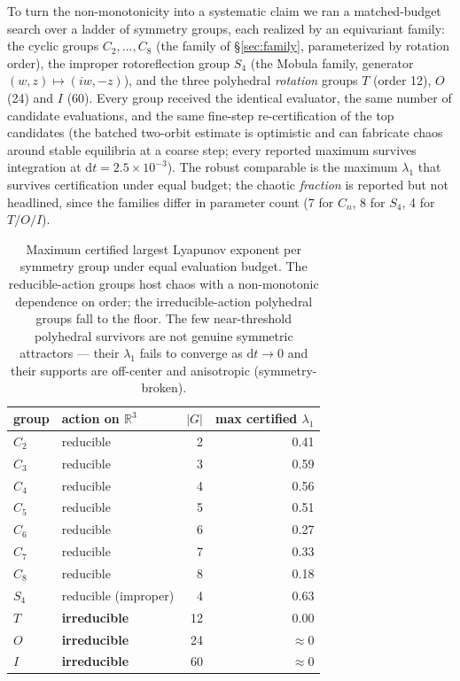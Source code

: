 \documentclass[11pt]{article}
\begin{document}
To turn the non-monotonicity into a systematic claim we ran a
matched-budget search over a ladder of symmetry groups, each realized by
an equivariant family: the cyclic groups $C_2,\dots,C_8$ (the family of
\S\ref{sec:family}, parameterized by rotation order), the improper
rotoreflection group $S_4$ (the Mobula family, generator
$(w,z)\mapsto(iw,-z)$), and the three polyhedral \emph{rotation} groups
$T$ (order 12), $O$ (24) and $I$ (60). Every group received the identical
evaluator, the same number of candidate evaluations, and the same
fine-step re-certification of the top candidates (the batched two-orbit
estimate is optimistic and can fabricate chaos around stable equilibria
at a coarse step; every reported maximum survives integration at
$\mathrm{d}t=2.5\times10^{-3}$). The robust comparable is the maximum
$\lambda_1$ that survives certification under equal budget; the chaotic
\emph{fraction} is reported but not headlined, since the families differ
in parameter count (7 for $C_n$, 8 for $S_4$, 4 for $T/O/I$).

\begin{table}[t]\centering
\begin{tabular}{llrr}
\toprule
group & action on $\mathbb{R}^3$ & $|G|$ & max certified $\lambda_1$\\
\midrule
$C_2$ & reducible & 2 & 0.41\\
$C_3$ & reducible & 3 & 0.59\\
$C_4$ & reducible & 4 & 0.56\\
$C_5$ & reducible & 5 & 0.51\\
$C_6$ & reducible & 6 & 0.27\\
$C_7$ & reducible & 7 & 0.33\\
$C_8$ & reducible & 8 & 0.18\\
$S_4$ & reducible (improper) & 4 & 0.63\\
$T$   & \textbf{irreducible} & 12 & $\mathbf{0.00}$\\
$O$   & \textbf{irreducible} & 24 & $\approx 0$\\
$I$   & \textbf{irreducible} & 60 & $\approx 0$\\
\bottomrule
\end{tabular}
\caption{Maximum certified largest Lyapunov exponent per symmetry group
under equal evaluation budget. The reducible-action groups host chaos
with a non-monotonic dependence on order; the irreducible-action
polyhedral groups fall to the floor. The few near-threshold polyhedral
survivors are not genuine symmetric attractors --- their $\lambda_1$ fails
to converge as $\mathrm{d}t\to0$ and their supports are off-center and
anisotropic (symmetry-broken).}\label{tab:law}
\end{table}
\end{document}

